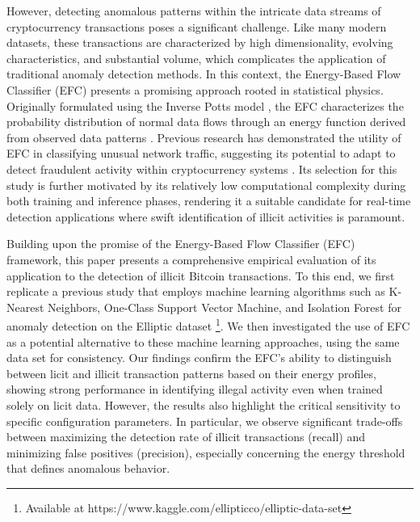 \documentclass[12pt]{article}
\begin{document}
However, detecting anomalous patterns within the intricate data streams of cryptocurrency transactions poses a significant
challenge. Like many modern datasets, these transactions are characterized by high dimensionality, evolving characteristics,
and substantial volume, which complicates the application of traditional anomaly detection methods. In this context, the
Energy-Based Flow Classifier (EFC) presents a promising approach rooted in statistical physics. Originally formulated using
the Inverse Potts model \cite{pontes2019}, the EFC characterizes the probability distribution of normal data flows through
an energy function derived from observed data patterns \cite{pontes2019}. Previous research has demonstrated the utility
of EFC in classifying unusual network traffic, suggesting its potential to adapt to detect fraudulent activity within cryptocurrency
systems \cite{pontes2019, souza2022novelopensetenergybased}. Its selection for this study is further motivated by its relatively
low computational complexity during both training and inference phases, rendering it a suitable candidate for real-time detection
applications where swift identification of illicit activities is paramount.

Building upon the promise of the Energy-Based Flow Classifier (EFC) framework, this paper presents a comprehensive empirical
evaluation of its application to the detection of illicit Bitcoin transactions. To this end, we first replicate a previous
study that employs machine learning algorithms such as K-Nearest Neighbors, One-Class Support Vector Machine, and Isolation
Forest for anomaly detection on the Elliptic dataset \footnote{Available at https://www.kaggle.com/ellipticco/elliptic-data-set}.
We then investigated the use of EFC as a potential alternative to these machine learning approaches, using the same data set
for consistency. Our findings confirm the EFC's ability to distinguish between licit and illicit transaction patterns based
on their energy profiles, showing strong performance in identifying illegal activity even when trained solely on licit data.
However, the results also highlight the critical sensitivity to specific configuration parameters. In particular, we observe
significant trade-offs between maximizing the detection rate of illicit transactions (recall) and minimizing false positives
(precision), especially concerning the energy threshold that defines anomalous behavior. 
\end{document}
